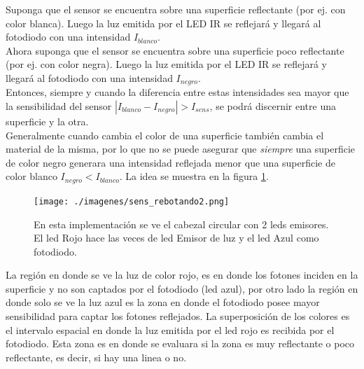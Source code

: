 \documentclass[10pt,conference,a4paper,onecolumn]{article}%
\begin{document}
Suponga que el sensor se encuentra sobre una superficie reflectante (por ej. con color blanca). Luego la luz emitida por el LED IR se reflejará y llegará al fotodiodo con una intensidad $I_{blanco}$.\\
Ahora suponga que el sensor se encuentra sobre una superficie poco reflectante (por ej. con color negra). Luego la luz emitida por el LED IR se reflejará y llegará al fotodiodo con una intensidad $I_{negro}$.\\
Entonces, siempre y cuando la diferencia entre estas intensidades sea mayor que la sensibilidad del sensor  $|I_{blanco} - I_{negro} |> I_{sens}$, se podrá discernir entre una superficie y la otra. \\
Generalmente cuando cambia el color de una superficie también cambia el material de la misma, por lo que no se puede asegurar que \textit{siempre} una superficie de color negro generara una intensidad reflejada menor que una superficie de color blanco $I_{negro} <I_{blanco}$. 
 La idea se muestra en la figura \ref{fig:sensorLinea}.\\
\begin{figure}[h]
\centering
\texttt{[image: ./imagenes/sens\_rebotando2.png]}%
\caption{En esta implementación se ve el cabezal circular con 2 leds emisores. El led Rojo hace las veces de led Emisor de luz y el led Azul como fotodiodo.}
\label{fig:sensorLinea}
\end{figure}
La región en donde se ve la luz de color rojo, es en donde los fotones inciden en la superficie y no son captados por el fotodiodo (led azul), por otro lado la región en donde solo se ve la luz azul es la zona en donde el fotodiodo posee mayor sensibilidad para captar los fotones reflejados. La superposición de los colores es el intervalo espacial en donde la luz emitida por el led rojo es recibida por el fotodiodo. Esta zona es en donde se evaluara si la zona es muy reflectante o poco reflectante, es decir, si hay una linea o no.
\end{document}
